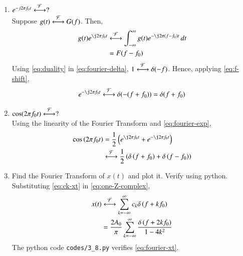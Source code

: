\documentclass[journal,12pt,twocolumn]{IEEEtran}
\renewcommand\thesection{\arabic{section}}
\begin{document}
\begin{enumerate}[label=\thesection.\arabic*
,ref=\thesection.\theenumi]
\begin{align}
             &=\int_{-\infty}^{\infty}\delta(0)\, dt \\
             &=\int_{-\infty}^{\infty}\delta(t)\, dt = 1
             \label{eq:fourier-delta}
\end{align}
\item $e^{-j2\pi f_0t}\overset{\mathcal{F}}{ \longleftrightarrow}?$\\
\solution Suppose $g(t)\overset{\mathcal{F}}{ \longleftrightarrow}G(f)$. Then,
\begin{align}
    g(t)e^{\j2\pi f_0t}&\system{F}\int_{-\infty}^{\infty}
                       g(t)e^{-\j2\pi\brak{f-f_0}t}\, dt \\
                       &=F(f-f_0)
                       \label{eq:f-shift}
\end{align}
Using \eqref{eq:duality} in \eqref{eq:fourier-delta}, $1\overset{\mathcal{F}}{ \longleftrightarrow}\delta(-f)$.
Hence, applying \eqref{eq:f-shift},
\begin{align}
    e^{-\j2\pi f_0t}\system{F}\delta(-(f+f_0)) = \delta(f+f_0)
    \label{eq:fourier-exp}
\end{align}
\item $\cos(2\pi f_0t)\overset{\mathcal{F}}{ \longleftrightarrow}?$\\
\solution Using the linearity of the Fourier 
Transform and \eqref{eq:fourier-exp},
\begin{align}
    \cos\brak{2\pi f_0t} &= \frac{1}{2}
                         \brak{e^{\j2\pi f_0t} + e^{-\j2\pi f_0t}} \\
                         &\system{F}\frac{1}{2}\brak{\delta\brak{f+f_0} + \delta\brak{f-f_0}}
\end{align}
\item Find the Fourier Transform of $x(t)$ and plot it. Verify using python.\\
\solution Substituting \eqref{eq:ck-xt} in \eqref{eq:one-Z-complex},
\begin{align}
    x(t)&\overset{\mathcal{F}}{ \longleftrightarrow}\sum_{k=-\infty}^{\infty}c_k\delta\left(f+kf_0\right) \\
        &=\frac{2A_0}{\pi}\sum_{k=-\infty}^{\infty}\frac{\delta\left(f+2kf_0\right)}{1-4k^2}
        \label{eq:fourier-xt}
\end{align}
The python code \texttt{codes/3\_8.py} verifies \eqref{eq:fourier-xt}.
\begin{figure}[!ht]

\end{figure}
\end{enumerate}
\end{document}
